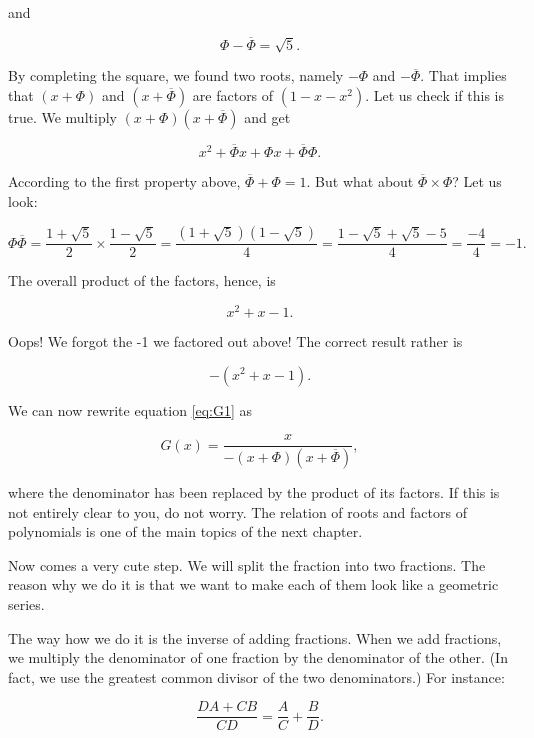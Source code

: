 \documentclass[tikz]{scrreprt}
\begin{document}
and

\begin{equation}
\Phi - \overline{\Phi} = \sqrt{5}.
\end{equation}

By completing the square, we found two roots,
namely $-\Phi$ and $-\overline{\Phi}$.
That implies that $(x + \Phi)$ and $(x + \overline{\Phi})$
are factors of $(1 - x - x^2)$.
Let us check if this is true. We multiply
$(x + \Phi)(x + \overline{\Phi})$ and get

\[
x^2 + \overline{\Phi}x + \Phi x + \overline{\Phi}\Phi.
\]

According to the first property above,
$\overline{\Phi} + \Phi = 1$.
But what about $\overline{\Phi}\times \Phi$?
Let us look:

\begin{equation}
\Phi\overline{\Phi} = \frac{1+\sqrt{5}}{2}\times\frac{1-\sqrt{5}}{2} = 
\frac{(1+\sqrt{5})(1-\sqrt{5})}{4} = 
\frac{1-\sqrt{5}+\sqrt{5}-5}{4} =
\frac{-4}{4} = -1.
\end{equation}

The overall product of the factors, hence, is

\[
x^2 + x - 1.
\]

Oops! We forgot the -1 we factored out above!
The correct result rather is

\[
-(x^2 + x - 1).
\]


We can now rewrite equation \ref{eq:G1} as

\begin{equation}\label{eq:G2}
G(x) = \frac{x}{-(x+\Phi)(x+\overline{\Phi})},
\end{equation}

where the denominator has been replaced by 
the product of its factors.
If this is not entirely clear to you,
do not worry. The relation of roots and factors
of polynomials is one of the main topics
of the next chapter.

Now comes a very cute step.
We will split the fraction into two fractions.
The reason why we do it is that we want to
make each of them look like a geometric series.

The way how we do it is the inverse of
adding fractions. When we add fractions,
we multiply the denominator of one fraction
by the denominator of the other.
(In fact, we use the greatest common divisor
of the two denominators.)
For instance:

\begin{equation}
\frac{DA+CB}{CD} = \frac{A}{C} + \frac{B}{D}.
\end{equation}
\end{document}
